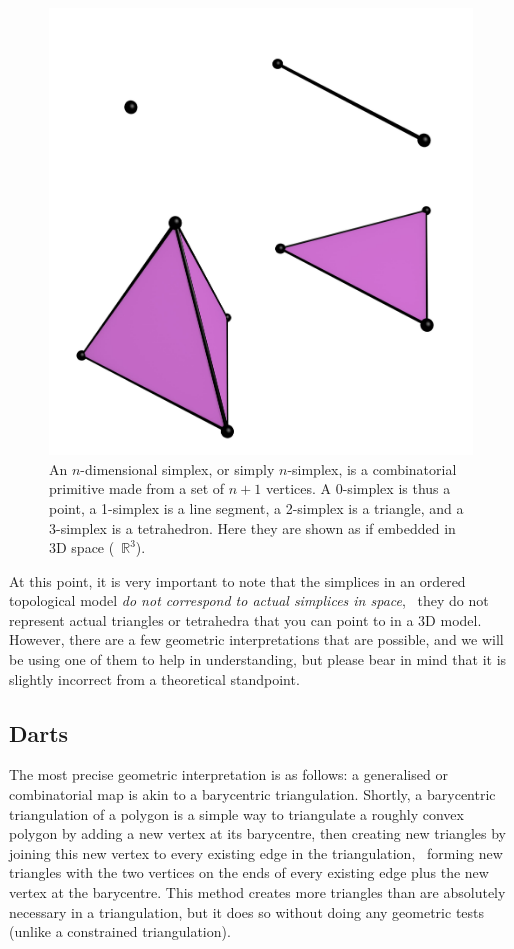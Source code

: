 \begin{figure}
\centering
\includegraphics[width=0.5\linewidth]{figs/simplex}
\caption{An \(n\)-dimensional simplex, or simply \(n\)-simplex, is a combinatorial primitive made from a set of \(n+1\) vertices.
A 0-simplex is thus a point, a 1-simplex is a line segment, a 2-simplex is a triangle, and a 3-simplex is a tetrahedron.
Here they are shown as if embedded in 3D space (\ie\ \(\mathbb{R}^3\)).}%
\label{fig:simplices}
\end{figure}

At this point, it is very important to note that the simplices in an ordered topological model \emph{do not correspond to actual simplices in space}, \ie\ they do not represent actual triangles or tetrahedra that you can point to in a 3D model.
However, there are a few geometric interpretations that are possible, and we will be using one of them to help in understanding, but please bear in mind that it is slightly incorrect from a theoretical standpoint.

\subsection{Darts}

The most precise geometric interpretation is as follows: a generalised or combinatorial map is akin to a barycentric triangulation.
Shortly, a barycentric triangulation of a polygon is a simple way to triangulate a roughly convex polygon by adding a new vertex at its barycentre, then creating new triangles by joining this new vertex to every existing edge in the triangulation, \ie\ forming new triangles with the two vertices on the ends of every existing edge plus the new vertex at the barycentre.
This method creates more triangles than are absolutely necessary in a triangulation, but it does so without doing any geometric tests (unlike a constrained triangulation).

